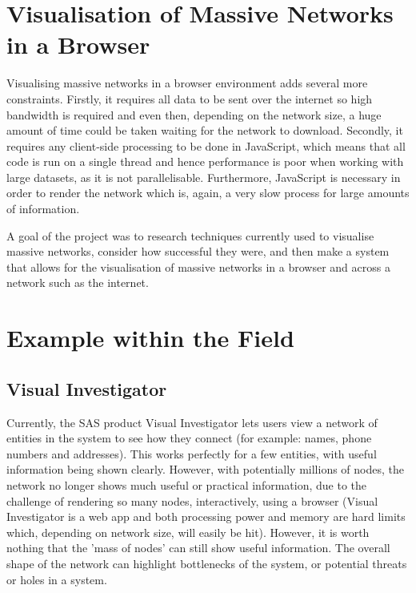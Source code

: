 \documentclass[../dissertation.tex]{subfiles}
\begin{document}
\section{Visualisation of Massive Networks in a Browser}

Visualising massive networks in a browser environment adds several more constraints. Firstly, it requires all data to be sent over the internet so high bandwidth is required and even then, depending on the network size, a huge amount of time could be taken waiting for the network to download. Secondly, it requires any client-side processing to be done in JavaScript, which means that all code is run on a single thread \cite{herhut2012parallel} and hence performance is poor when working with large datasets, as it is not parallelisable. Furthermore, JavaScript is necessary in order to render the network which is, again, a very slow process for large amounts of information. 

A goal of the project was to research techniques currently used to visualise massive networks, consider how successful they were, and then make a system that allows for the visualisation of massive networks in a browser and across a network such as the internet. 

\section{Example within the Field}

\subsection{Visual Investigator}

Currently, the SAS product Visual Investigator \cite{sasvi} lets users view a network of entities in the system to see how they connect (for example: names, phone numbers and addresses). This works perfectly for a few entities, with useful information being shown clearly. However, with potentially millions of nodes, the network no longer shows much useful or practical information, due to the challenge of rendering so many nodes, interactively, using a browser (Visual Investigator is a web app and both processing power and memory are hard limits which, depending on network size, will easily be hit). However, it is worth nothing that the 'mass of nodes' can still show useful information. The overall shape of the network can highlight bottlenecks of the system, or potential threats or holes in a system.
\end{document}
